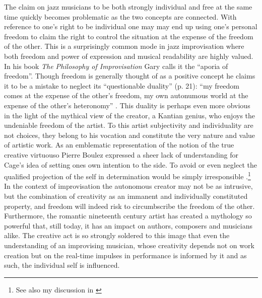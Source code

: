 \documentclass[a4paper]{article}
\begin{document}
The claim on jazz musicians to be both strongly individual and free at the same time quickly becomes problematic as the two concepts are connected. With reference to one's right to be individual one may may end up using one's personal freedom to claim the right to control the situation at the expense of the freedom of the other. This is a surprisingly common mode in jazz improvisation where both freedom and power of expression and musical readability are highly valued. In his book \emph{The Philosophy of Improvisation} Gary \citet{peters09} calls it the ``aporia of freedom''. Though freedom is generally thought of as a positive concept he claims it to be a mistake to neglect its ``questionable duality'' (p. 21): ``my freedom comes at the expense of the other's freedom, my own autonumous world at the expense of the other's heteronomy'' \citep[p. 165]{benson03}. This duality is perhaps even more obvious in the light of the mythical view of the creator, a Kantian genius, who enjoys the undeniable freedom of the artist. To this artist subjectivity and individuality are not choices, they belong to his vocation and constitute the very nature and value of artistic work. As an emblematic representation of the notion of the true creative virtuouso Pierre Boulez expressed a sheer lack of understanding for Cage's idea of setting ones own intention to the side. To avoid or even neglect the qualified projection of the self in determination would be simply irresponsible \citep{boulez64}.\footnote{See also my discussion in \citet[p. 144-5]{frisk2013}} In the context of improvisation the autonomous creator may not be as intrusive, but the combination of creativity as an immanent and individually constituted property, and freedom will indeed risk to circumbscribe the freedom of the other. Furthermore, the romantic nineteenth century artist has created a mythology so powerful that, still today, it has an impact on authors, composers and musicians alike. The creative act is so strongly soldered to this image that even the understanding of an improvising musician, whose creativity depends not on work creation but on the real-time impulses in performance is informed by it and as such, the individual self is influenced. 



\end{document}
